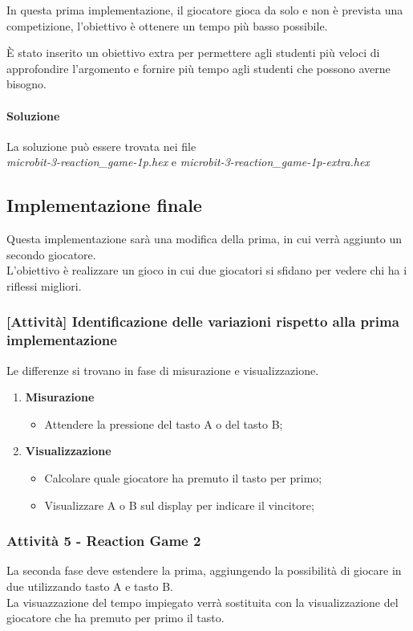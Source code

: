 \documentclass[../../docenti.tex]{subfiles}
\begin{document}
In questa prima implementazione, il giocatore gioca da solo e non è prevista una competizione, l'obiettivo è ottenere un tempo più basso possibile.

È stato inserito un obiettivo extra per permettere agli studenti più veloci di approfondire l'argomento e fornire più tempo agli studenti che possono averne bisogno.

\paragraph{Soluzione}
La soluzione può essere trovata nei file\\
 \textit{microbit-3-reaction\_game-1p.hex} e \textit{microbit-3-reaction\_game-1p-extra.hex}

\subsection{Implementazione finale}

Questa implementazione sarà una modifica della prima, in cui verrà aggiunto un secondo giocatore.\\
L'obiettivo è realizzare un gioco in cui due giocatori si sfidano per vedere chi ha i riflessi migliori.

\subsubsection{[Attività] Identificazione delle variazioni rispetto alla prima implementazione}
Le differenze si trovano in fase di misurazione e visualizzazione.
\begin{enumerate}
	\item \textbf{Misurazione}
	\begin{itemize}
		\item Attendere la pressione del tasto A o del tasto B;
	\end{itemize}
	\item \textbf{Visualizzazione}
	\begin{itemize}
		\item Calcolare quale giocatore ha premuto il tasto per primo;
		\item Visualizzare A o B sul display per indicare il vincitore;
	\end{itemize}
\end{enumerate}

\subsubsection{Attività 5 - Reaction Game 2}
La seconda fase deve estendere la prima, aggiungendo la possibilità di giocare in due utilizzando tasto A e tasto B.\\
La visuazzazione del tempo impiegato verrà sostituita con la visualizzazione del giocatore che ha premuto per primo il tasto.
\end{document}
